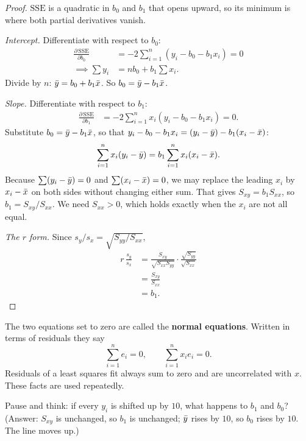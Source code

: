 \begin{proof}
$\mathrm{SSE}$ is a quadratic in $b_0$ and $b_1$ that opens upward, so its
minimum is where both partial derivatives vanish.

\emph{Intercept.} Differentiate with respect to $b_0$:
\begin{align*}
  \frac{\partial\,\mathrm{SSE}}{\partial b_0}
  &= -2\sum_{i=1}^n (y_i - b_0 - b_1 x_i) = 0 \\
  \implies \sum y_i &= n b_0 + b_1 \sum x_i .
\end{align*}
Divide by $n$: $\bar{y} = b_0 + b_1\bar{x}$. So $b_0 = \bar{y} - b_1\bar{x}$.

\emph{Slope.} Differentiate with respect to $b_1$:
\begin{align*}
  \frac{\partial\,\mathrm{SSE}}{\partial b_1}
  &= -2\sum_{i=1}^n x_i (y_i - b_0 - b_1 x_i) = 0 .
\end{align*}
Substitute $b_0 = \bar{y} - b_1\bar{x}$, so that
$y_i - b_0 - b_1x_i = (y_i-\bar{y}) - b_1(x_i-\bar{x})$:
\[
  \sum_{i=1}^n x_i (y_i-\bar{y}) = b_1 \sum_{i=1}^n x_i (x_i-\bar{x}).
\]
Because $\sum (y_i-\bar{y}) = 0$ and $\sum(x_i-\bar{x})=0$, we may replace the
leading $x_i$ by $x_i-\bar{x}$ on both sides without changing either sum. That
gives $S_{xy} = b_1 S_{xx}$, so $b_1 = S_{xy}/S_{xx}$. We need $S_{xx}>0$,
which holds exactly when the $x_i$ are not all equal.

\emph{The $r$ form.} Since $s_y/s_x = \sqrt{S_{yy}/S_{xx}}$,
\begin{align*}
  r\,\frac{s_y}{s_x} &= \frac{S_{xy}}{\sqrt{S_{xx}S_{yy}}}\cdot\frac{\sqrt{S_{yy}}}{\sqrt{S_{xx}}} \\
  &= \frac{S_{xy}}{S_{xx}} \\
  &= b_1 .
\end{align*}
\end{proof}

The two equations set to zero are called the \textbf{normal equations}. Written
in terms of residuals they say
\[
  \sum_{i=1}^n e_i = 0, \qquad \sum_{i=1}^n x_i e_i = 0 .
\]
Residuals of a least squares fit always sum to zero and are uncorrelated with
$x$. These facts are used repeatedly.

\begin{recoverybox}
Pause and think: if every $y_i$ is shifted up by $10$, what happens to $b_1$
and $b_0$? (Answer: $S_{xy}$ is unchanged, so $b_1$ is unchanged; $\bar{y}$ rises
by $10$, so $b_0$ rises by $10$. The line moves up.)
\end{recoverybox}

